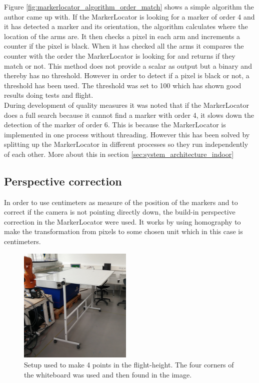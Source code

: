 Figure \ref{fig:markerlocator_algorithm_order_match} shows a simple algorithm the author came up with.
If the MarkerLocator is looking for a marker of order 4 and it has detected a marker and its orientation, the algorithm calculates where the location of the arms are. It then checks a pixel in each arm and increments a counter if the pixel is black. When it has checked all the arms it compares the counter with the order the MarkerLocator is looking for and returns if they match or not. 
This method does not provide a scalar as output but a binary and thereby has no threshold. However in order to detect if a pixel is black or not, a threshold has been used. The threshold was set to 100 which has shown good results doing tests and flight. \\

During development of quality measures it was noted that if the MarkerLocator does a full search because it cannot find a marker with order 4, it slows down the detection of the marker of order 6. This is because the MarkerLocator is implemented in one process without threading. However this has been solved by splitting up the MarkerLocator in different processes so they run independently of each other. More about this in section  \ref{sec:system_architecture_indoor} \\

\subsection{Perspective correction}  \label{sec:perspective_correction}
In order to use centimeters as measure of the position of the markers and to correct if the camera is not pointing directly down, the build-in perspective correction in the MarkerLocator were used.
It works by using homography\cite{janeriksolem2012} to make the transformation from pixels to some chosen unit which in this case is centimeters.
\begin{figure}
  \vspace{-20pt}
  \begin{center}
    \includegraphics[width=0.48\textwidth]{graphics/whiteboard_tilted.jpg}
  \end{center}
  \vspace{-20pt}
  \caption{Setup used to make 4 points in the flight-height. The four corners of the whiteboard was used and then found in the image. } \label{fig:whiteboard_setup}
  \vspace{-10pt}
\end{figure}

